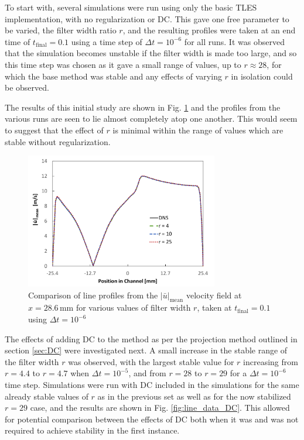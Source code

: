 To start with, several simulations were run using only the basic TLES implementation, with no regularization or DC. This gave one free parameter to be varied, the filter width ratio $r$, and the resulting profiles were taken at an end time of $t_\mathrm{final}=0.1$ using a time step of $\Delta t=10^{-6}$ for all runs. It was observed that the simulation becomes unstable if the filter width is made too large, and so this time step was chosen as it gave a small range of values, up to $r\approx 28$, for which the base method was stable and any effects of varying $r$ in isolation could be observed.

The results of this initial study are shown in Fig. \ref{fig:line_data_no_reg} and the profiles from the various runs are seen to lie almost completely atop one another. This would seem to suggest that the effect of $r$ is minimal within the range of values which are stable without regularization.

\begin{figure}[!htb]
\centering
\includegraphics[width=0.75\textwidth]{figures/line_data_no_reg.pdf}
\caption{Comparison of line profiles from the $|\bar{u}|_{\mathrm{mean}}$ velocity field at $x=28.6\,\mathrm{mm}$ for various values of filter width $r$, taken at $t_\mathrm{final}=0.1$ using $\Delta t=10^{-6}$}
\label{fig:line_data_no_reg}
\end{figure}

The effects of adding DC to the method as per the projection method outlined in section \ref{sec:DC} were investigated next. A small increase in the stable range of the filter width $r$ was observed, with the largest stable value for $r$ increasing from $r=4.4$ to $r=4.7$ when $\Delta t=10^{-5}$, and from $r=28$ to $r=29$ for a $\Delta t=10^{-6}$ time step. Simulations were run with DC included in the simulations for the same already stable values of $r$ as in the previous set as well as for the now stabilized $r=29$ case, and the results are shown in Fig. \ref{fig:line_data_DC}. This allowed for potential comparison between the effects of DC both when it was and was not required to achieve stability in the first instance.

